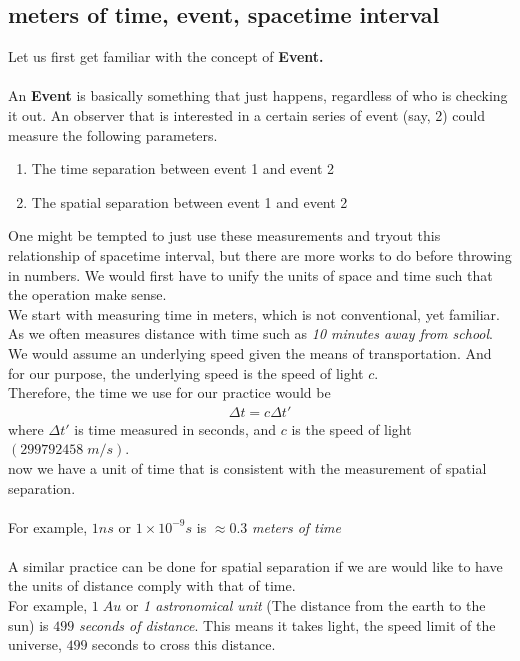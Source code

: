 \documentclass[12pt]{book}
\begin{document}
\subsection{meters of time, event, spacetime interval}
Let us first get familiar with the concept of \textbf{Event.}\\\\
An \textbf{Event} is basically something that just happens, regardless of who is checking it out. An observer that is interested in a certain series of event (say, 2) could measure the following parameters. 
\begin{enumerate}
    \item The time separation between event 1 and event 2
    \item The spatial separation between event 1 and event 2
\end{enumerate}
One might be tempted to just use these measurements and tryout this relationship of spacetime interval, but there are more works to do before throwing in numbers. We would first have to unify the units of space and time such that the operation make sense.\\
\newline
We start with measuring time in meters, which is not conventional, yet familiar. As we often measures distance with time such as \textit{10 minutes away from school}. We would assume an underlying speed given the means of transportation. And for our purpose, the underlying speed is the speed of light $c$.\\
Therefore, the time we use for our practice would be 
\begin{align}
\Delta t = c\Delta t' 
\end{align}
where $\Delta t'$ is time measured in seconds, and $c$ is the speed of light $(299792458\;m/s)$.\\
now we have a unit of time that is consistent with the measurement of spatial separation.\\
\\For example, $1ns$ or $1\times 10^{-9}s$ is $\approx 0.3$ \textit{meters of time}\\
\\A similar practice can be done for spatial separation if we are would like to have the units of distance comply with that of time.\\
\newline
For example, $1\; Au$ or \textit{1 astronomical unit} (The distance from the earth to the sun) is $499$ \textit{seconds of distance}. This means it takes light, the speed limit of the universe, $499$ seconds to cross this distance. 
\end{document}
